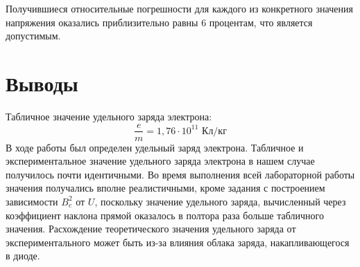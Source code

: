 \documentclass{article}%
\begin{document}
%
Получившиеся относительные погрешности для каждого из конкретного значения напряжения оказались приблизительно равны 6 процентам, что является допустимым.%
\section{Выводы}%
\label{sec:}%

%
Табличное значение удельного заряда электрона:\begin{displaymath}\frac{e}{m} = 1,76\cdot10^{11} \textit{ Кл/кг}\end{displaymath}%
\newline%
В ходе работы был определен удельный заряд электрона. Табличное и экспериментальное значение удельного заряда электрона в нашем случае получилось почти идентичными. Во время выполнения всей лабораторной работы значения получались вполне реалистичными, кроме задания с построением зависимости $B^2_c$ от $U$, поскольку значение удельного заряда, вычисленный через коэффициент наклона прямой оказалось в полтора раза больше табличного значения. Расхождение теоретического значения удельного заряда от экспериментального может быть из-за влияния облака заряда, накапливающегося в диоде. %
\newline%
\end{document}
